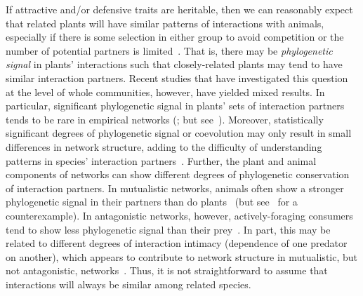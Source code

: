 \documentclass[12pt]{article}
\begin{document}
\begin{spacing}{1.5}
  If attractive and/or defensive traits are heritable,
  then we can reasonably expect that related plants will have similar 
  patterns of interactions with animals, especially if there is some selection in either group to avoid competition or the number of potential partners is limited~\citep{Schemske1999,Ponisio2017}. That is, there may be \emph{phylogenetic signal} in plants' interactions such that closely-related plants may tend to have similar interaction partners.
  Recent studies that have investigated this question at the level of whole
  communities, however, have yielded mixed results.
  In particular, significant phylogenetic signal in plants' sets of interaction partners tends to be rare in empirical networks (\citealp{Rezende2007a,Lind2015,Ibanez2016}; but see~\citealp{Elias2013,Fontaine2015,Hutchinson2017}). 
  Moreover, statistically significant degrees of phylogenetic signal or coevolution may only result in small differences in network structure, adding to the difficulty of understanding patterns in species' interaction partners~\citep{Ponisio2017}.
  Further, the plant and animal components of networks can show different degrees of phylogenetic conservation of interaction partners. In mutualistic networks, animals often show a stronger phylogenetic signal in their partners than do plants~\citep{Rezende2007a,Chamberlain2014,Rohr2014,Vamosi2014,Lind2015,Fontaine2015} (but see~\citet{Rafferty2013} for a counterexample). In antagonistic networks, however, actively-foraging consumers tend to show less phylogenetic signal than their prey~\citep{Ives2006,Cagnolo2011,Naisbit2011,Fontaine2015}. In part, this may be related to different degrees of interaction intimacy (dependence of one predator on another), which appears to contribute to network structure in mutualistic, but not antagonistic, networks~\citep{Guimaraes2007,Ponisio2017}. Thus, it is not straightforward to assume that interactions will always be similar among related species. 



\end{spacing}
\end{document}
